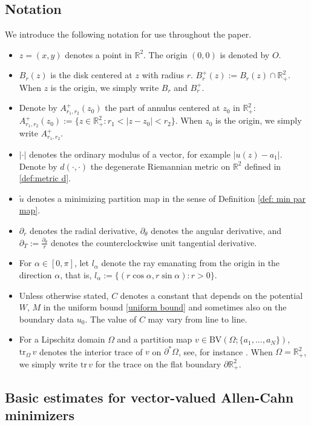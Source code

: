 \documentclass[leqno,11pt]{amsart}
\let\pa=\partial
\let\f=\frac
\let\Om=\Omega
\let\pa=\partial
\theoremstyle{remark}
\newcommand{\BR}{\mathbb{R}}
\begin{document}
\subsection{Notation}
We introduce the following notation for use throughout the paper. 
\begin{itemize}\itemsep5pt
    \item $z=(x,y)$ denotes a point in $\BR^2$. The origin $(0,0)$ is denoted by $O$.
    \item $B_r(z)$ is the disk centered at $z$ with radius $r$.  $B_r^+(z):=B_r(z)\cap \BR_+^2$. When $z$ is the origin, we simply write $B_r$ and $B_r^+$.
    \item Denote by $A^+_{r_1,r_2}(z_0)$ the part of annulus centered at $z_0$ in $\BR_+^2$: $A^+_{r_1,r_2}(z_0):=\{z\in \BR_+^2: r_1<|z-z_0|<r_2\}$. When $z_0$ is the origin, we simply write $A^+_{r_1,r_2}$.
    \item $|\cdot|$ denotes the ordinary modulus of a vector, for example $|u(z)-a_1|$. Denote by $d(\cdot,\cdot)$ the degenerate Riemannian metric on $\mathbb{R}^2$ defined in \eqref{def:metric d}.
    \item $\tilde{u}$ denotes a minimizing partition map in the sense of Definition \ref{def: min par map}.
    \item $\pa_r $ denotes the radial derivative, $\pa_\theta$ denotes the angular derivative, and $\pa_T:=\f{\pa_\theta }{r}$ denotes the counterclockwise unit tangential derivative.
    \item For $\alpha \in [0,\pi]$, let $l_\alpha$ denote the ray emanating from the origin in the direction $\alpha$, that is, $l_\alpha := \{ (r\cos\alpha, r\sin\alpha) : r > 0 \}.$
    \item Unless otherwise stated, $C$ denotes a constant that depends on the potential $W$, $M$ in the uniform bound \eqref{uniform bound} and sometimes also on the boundary data $u_0$. The value of $C$ may vary from line to line.
    \item For a Lipschitz domain $\Omega$ and a partition map $v\in \mathrm{BV}(\Om;\{a_1,...,a_N\})$, $\mathrm{tr}_\Om\, v$ denotes the interior trace of $v$ on $\pa^*\Om$, see, for instance \cite[Chapter 2]{giusti1984minimal}. When $\Omega=\BR_+^2$, we simply write $\mathrm{tr}\, v$ for the trace on the flat boundary $\pa \BR_+^2$.  
\end{itemize}

\subsection{Basic estimates for vector-valued Allen-Cahn minimizers}
\end{document}
